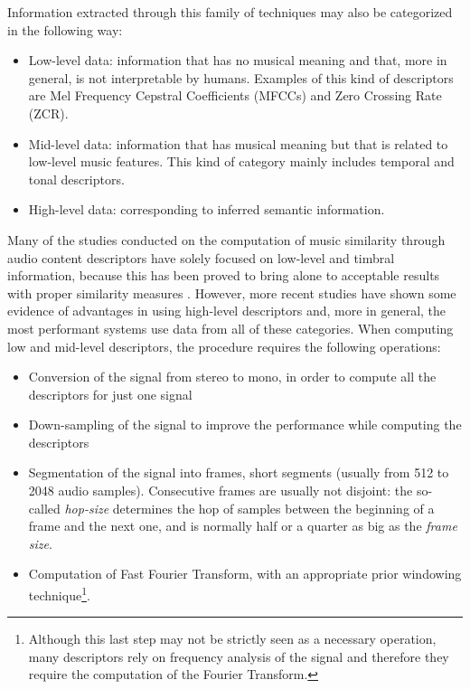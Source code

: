 Information extracted through this family of techniques may also be categorized in the following way:
\begin{itemize}
\item Low-level data: information that has no musical meaning and that, more in general, is not interpretable by humans. Examples of this kind of descriptors are Mel Frequency Cepstral Coefficients (MFCCs) and Zero Crossing Rate (ZCR).
\item Mid-level data: information that has musical meaning but that is related to low-level music features. This kind of category mainly includes temporal and tonal descriptors. 
\item High-level data: corresponding to inferred semantic information.
\end{itemize}

Many of the studies conducted on the computation of music similarity through audio content descriptors have solely focused on low-level and timbral information, because this has been proved to bring alone to acceptable results with proper similarity measures \cite{mirage07}. However, more recent studies have shown some evidence of advantages in using high-level descriptors \cite{barrington07} \cite{west07} and, more in general, the most performant systems use data from all of these categories. When computing low and mid-level descriptors, the procedure requires the following operations:
\begin{itemize}
\item Conversion of the signal from stereo to mono, in order to compute all the descriptors for just one signal
\item Down-sampling of the signal to improve the performance while computing the descriptors
\item Segmentation of the signal into frames, short segments (usually from 512 to 2048 audio samples). Consecutive frames are usually not disjoint: the so-called \textit{hop-size} determines the hop of samples between the beginning of a frame and the next one, and is normally half or a quarter as big as the \textit{frame size}.
\item Computation of Fast Fourier Transform, with an appropriate prior windowing technique\footnote{Although this last step may not be strictly seen as a necessary operation, many descriptors rely on frequency analysis of the signal and therefore they require the computation of the Fourier Transform.}.
\end{itemize}

